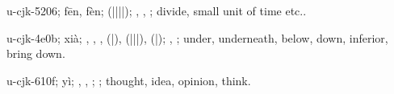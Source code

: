 \begin{multicols}{2}
{\cjkgGlue{}u-cjk-5206; fēn, fèn; \cjkgGlue{}\cjkgGlue{}(\cjkgGlue{}|\cjkgGlue{}|\cjkgGlue{}|\cjkgGlue{}|\cjkgGlue{}); \cjkgGlue{}, \cjkgGlue{}, \cjkgGlue{}; divide, small unit of time etc..

\cjkgGlue{}u-cjk-4e0b; xià; \cjkgGlue{}, \cjkgGlue{}, \cjkgGlue{}, \cjkgGlue{}\cjkgGlue{}(\cjkgGlue{}|\cjkgGlue{}), \cjkgGlue{}\cjkgGlue{}(\cjkgGlue{}|\cjkgGlue{}|\cjkgGlue{}|\cjkgGlue{}), \cjkgGlue{}\cjkgGlue{}(\cjkgGlue{}|\cjkgGlue{}); \cjkgGlue{}, \cjkgGlue{}; under, underneath, below, down, inferior, bring down.

\cjkgGlue{}u-cjk-610f; yì; \cjkgGlue{}, \cjkgGlue{}, \cjkgGlue{}; \cjkgGlue{}; thought, idea, opinion, think.

}
\end{multicols}
